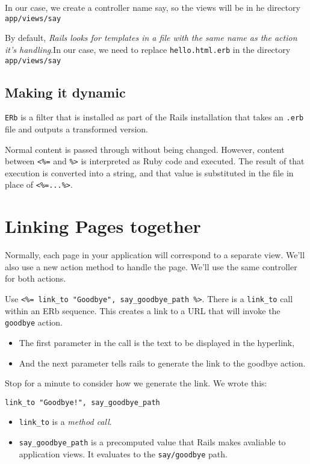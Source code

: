 \documentclass[11pt, a4paper]{book}
\begin{document}
In our case, we create a controller name say, so the views will be in he
directory \verb|app/views/say|

By default, \emph{Rails looks for templates in a file with the same name as the
action it's handling}.In our case, we need to replace \verb|hello.html.erb| in
the directory \verb|app/views/say|
\subsection{Making it dynamic}
\verb|ERb| is a filter that is installed as part of the Rails installation that
takes an \verb|.erb| file and outputs a transformed version.

Normal content is passed through without being changed. However, content between
\verb|<%=| and \verb|%>| is interpreted as Ruby code and executed. The result of
that execution is converted into a string, and that value is substituted in the
file in place of \verb|<%=...%>|.
\section{Linking Pages together}
Normally, each page in your application will correspond to a separate view.
We'll also use a new action method to handle the page. We'll use the same
controller for both actions.

Use \verb|<%= link_to "Goodbye", say_goodbye_path %>|. There is a \verb|link_to|
call within an ERb sequence. This creates a link to a URL that will invoke the
\verb|goodbye| action.
\begin{itemize}
\item The first parameter in the call is the text to be
displayed in the hyperlink,
\item And the next parameter tells rails to generate the
link to the goodbye action.
\end{itemize}

Stop for a minute to consider how we generate the link. We wrote this:
\begin{verbatim}
link_to "Goodbye!", say_goodbye_path
\end{verbatim}

\begin{itemize}
\item \verb|link_to| is a \emph{method call}. 
\item \verb|say_goodbye_path| is a precomputed value that Rails makes avaliable
to application views. It evaluates to the \verb|say/goodbye| path. 
\end{itemize}
\end{document}
